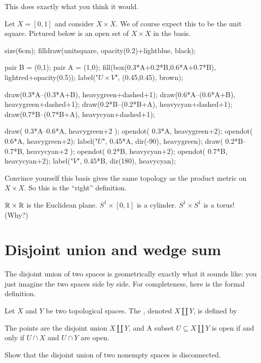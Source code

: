 This does exactly what you think it would.
\begin{example}
	Let $X = [0,1]$ and consider $X \times X$.
	We of course expect this to be the unit square.
	Pictured below is an open set of $X \times X$ in the basis.
	\begin{center}
		\begin{asy}
		size(6cm);
		filldraw(unitsquare, opacity(0.2)+lightblue, black);

		pair B = (0,1);
		pair A = (1,0);
		fill(box(0.3*A+0.2*B,0.6*A+0.7*B), lightred+opacity(0.5));
		label("$U \times V$", (0.45,0.45), brown);

		draw(0.3*A--(0.3*A+B), heavygreen+dashed+1);
		draw(0.6*A--(0.6*A+B), heavygreen+dashed+1);
		draw(0.2*B--(0.2*B+A), heavycyan+dashed+1);
		draw(0.7*B--(0.7*B+A), heavycyan+dashed+1);

		draw( 0.3*A--0.6*A, heavygreen+2 );
		opendot( 0.3*A,  heavygreen+2);
		opendot( 0.6*A, heavygreen+2);
		label("$U$", 0.45*A, dir(-90), heavygreen);
		draw( 0.2*B--0.7*B, heavycyan+2 );
		opendot( 0.2*B, heavycyan+2);
		opendot( 0.7*B, heavycyan+2);
		label("$V$", 0.45*B, dir(180), heavycyan);
		\end{asy}
	\end{center}
\end{example}
\begin{exercise}
	Convince yourself this basis gives the same topology
	as the product metric on $X \times X$.
	So this is the ``right'' definition.
\end{exercise}

\begin{example}
	\listhack
	\begin{enumerate}[(a)]
		\ii $\mathbb R \times \mathbb R$ is the Euclidean plane.
		\ii $S^1 \times [0,1]$ is a cylinder.
		\ii $S^1 \times S^1$ is a torus! (Why?)
	\end{enumerate}
\end{example}

\section{Disjoint union and wedge sum}

The disjoint union of two spaces is geometrically exactly
what it sounds like: you just imagine the two spaces side by side.
For completeness, here is the formal definition.
\begin{definition}
	Let $X$ and $Y$ be two topological spaces.
	The , denoted $X \amalg Y$, is defined by
	\begin{itemize}
		\ii The points are the disjoint union $X \amalg Y$, and
		\ii A subset $U \subseteq X \amalg Y$ is open if
		and only if $U \cap X$ and $U \cap Y$ are open.
	\end{itemize}
\end{definition}
\begin{exercise}
	Show that the disjoint union of two nonempty spaces is disconnected.
\end{exercise}

